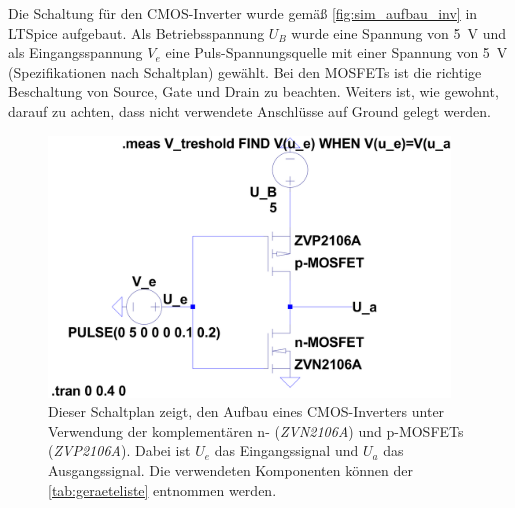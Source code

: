 \documentclass[12pt,english,ngerman]{scrartcl}
\begin{document}
Die Schaltung für den CMOS-Inverter wurde gemäß \autoref{fig:sim_aufbau_inv} in LTSpice aufgebaut.
Als Betriebsspannung $U_B$ wurde eine Spannung von \SI{5}{\volt} und als Eingangsspannung $V_e$
eine Puls-Spannungsquelle mit einer Spannung von \SI{5}{\volt} (Spezifikationen nach Schaltplan) gewählt.
Bei den MOSFETs ist die richtige Beschaltung von Source, Gate und Drain zu beachten.
Weiters ist, wie gewohnt, darauf zu achten, dass nicht verwendete Anschlüsse auf Ground gelegt werden.
\begin{figure}[H]
  \centering
    \includegraphics[width=0.95\textwidth]{./simdaten_lab/cmos/inverter/schaltung.png}
    \caption{Dieser Schaltplan zeigt, den Aufbau eines CMOS-Inverters unter
    Verwendung der komplementären n- (\textit{ZVN2106A}) und p-MOSFETs
    (\textit{ZVP2106A}). Dabei ist $U_e$ das Eingangssignal und $U_a$ das Ausgangssignal.
    Die verwendeten Komponenten können der \autoref{tab:geraeteliste} entnommen werden.
  }
  \label{fig:sim_aufbau_inv}
\end{figure}
\end{document}
